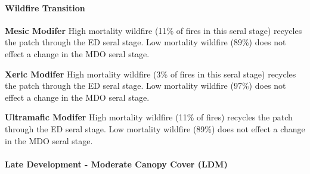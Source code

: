 \paragraph{Wildfire Transition}
\begin{adjustwidth}{2cm}{}
\textbf{Mesic Modifer } High mortality wildfire (11\% of fires in this seral stage) recycles the patch through the ED seral stage. Low mortality wildfire (89\%) does not effect a change in the MDO seral stage. 

\medskip
\noindent \textbf{Xeric Modifer} High mortality wildfire (3\% of fires in this seral stage) recycles the patch through the ED seral stage. Low mortality wildfire (97\%) does not effect a change in the MDO seral stage.

\medskip
\noindent \textbf{Ultramafic Modifer} High mortality wildfire (11\% of fires) recycles the patch through the ED seral stage. Low mortality wildfire (89\%) does not effect a change in the MDO seral stage.

\end{adjustwidth}
\noindent\hrulefill

\paragraph{Late Development - Moderate Canopy Cover (LDM)}

